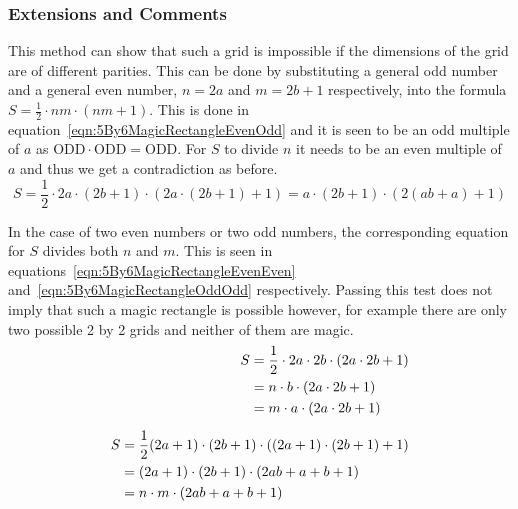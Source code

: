 \subsubsection{Extensions and Comments}

This method can show that such a grid is impossible if the dimensions of the grid are of different parities. This can be done by substituting a general odd number and a general even number, $n = 2a$ and $m = 2b + 1$ respectively, into the formula $S = \frac{1}{2} \cdot nm  \cdot (nm + 1)$. This is done in equation~\eqref{eqn:5By6MagicRectangleEvenOdd} and it is seen to be an odd multiple of $a$ as $\text{ODD} \cdot \text{ODD} = \text{ODD}$. For $S$ to divide $n$ it needs to be an even multiple of $a$ and thus we get a contradiction as before.
\begin{equation}
	S = \frac{1}{2} \cdot 2a \cdot (2b + 1) \cdot (2a \cdot (2b + 1) + 1) = a \cdot (2b + 1) \cdot (2(ab + a) + 1)
	\label{eqn:5By6MagicRectangleEvenOdd}
\end{equation}

In the case of two even numbers or two odd numbers, the corresponding equation for $S$ divides both $n$ and $m$. This is seen in equations~\eqref{eqn:5By6MagicRectangleEvenEven} and~\eqref{eqn:5By6MagicRectangleOddOdd} respectively. Passing this test does not imply that such a magic rectangle is possible however, for example there are only two possible 2 by 2 grids and neither of them are magic.
\begin{subequations}
	\begin{align}
		\notag\\[-6mm]
		\begin{split}
			S &= \frac{1}{2} \cdot 2a \cdot 2b \cdot (2a \cdot 2b + 1)  \\
			&= n \cdot b \cdot (2a \cdot 2b + 1)  \\
			&= m \cdot a \cdot (2a \cdot 2b + 1)
			\label{eqn:5By6MagicRectangleEvenEven}
		\end{split}\\[2mm]		
		\begin{split}
			S &= \frac{1}{2} (2a + 1) \cdot (2b + 1) \cdot ((2a + 1) \cdot (2b + 1) + 1)  \\
			&= (2a + 1) \cdot (2b + 1) \cdot (2ab + a + b + 1)  \\
			&= n \cdot m \cdot (2ab + a + b + 1)
			\label{eqn:5By6MagicRectangleOddOdd}
		\end{split}\\[-6mm]\notag
	\end{align}
\end{subequations}